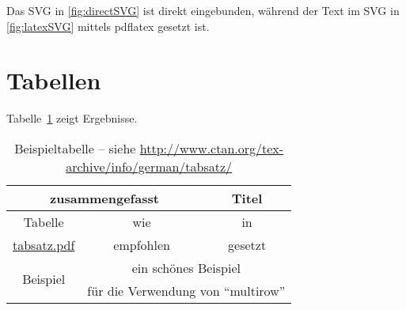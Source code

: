 Das SVG in \cref{fig:directSVG} ist direkt eingebunden, während der Text im SVG in \cref{fig:latexSVG} mittels pdflatex gesetzt ist.

\iffalse %
\begin{figure}
\centering
\texttt{[image: svgexample.svg]}
\caption{SVG direkt eingebunden}
\label{fig:directSVG}
\end{figure}

\begin{figure}
\centering
\def\svgwidth{.4\textwidth}

\caption{Text im SVG mittels \LaTeX{} gesetzt}
\label{fig:latexSVG}
\end{figure}
\fi %

\section{Tabellen}
Tabelle~\ref{tab:Ergebnisse} zeigt Ergebnisse.
\begin{table}
  \centering
  \begin{tabular}{ccc}
  \toprule
  \multicolumn{2}{c}{\textbf{zusammengefasst}} & \textbf{Titel} \\ \midrule
  Tabelle & wie & in \\
  \url{tabsatz.pdf}& empfohlen & gesetzt\\

  \multirow{2}{*}{Beispiel} & \multicolumn{2}{c}{ein schönes Beispiel}\\
   & \multicolumn{2}{c}{für die Verwendung von \enquote{multirow}}\\
  \bottomrule
  \end{tabular}
  \caption[Beispieltabelle]{Beispieltabelle -- siehe \url{http://www.ctan.org/tex-archive/info/german/tabsatz/}}
  \label{tab:Ergebnisse}
\end{table}

